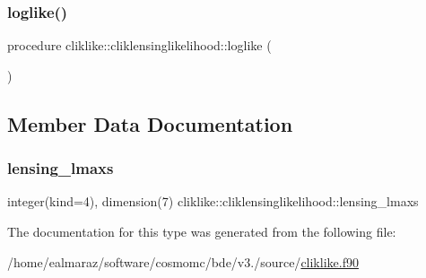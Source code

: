 \subsubsection{\texorpdfstring{loglike()}{loglike()}}
{\footnotesize\ttfamily procedure cliklike\+::cliklensinglikelihood\+::loglike (\begin{DoxyParamCaption}{ }\end{DoxyParamCaption})}



\subsection{Member Data Documentation}
\mbox{\label{structcliklike_1_1cliklensinglikelihood_a9a82c64f795e769f631396177fd0e6d2}} 
\subsubsection{\texorpdfstring{lensing\+\_\+lmaxs}{lensing\_lmaxs}}
{\footnotesize\ttfamily integer(kind=4), dimension(7) cliklike\+::cliklensinglikelihood\+::lensing\+\_\+lmaxs}



The documentation for this type was generated from the following file\+:\begin{DoxyCompactItemize}
\item 
/home/ealmaraz/software/cosmomc/bde/v3./source/\mbox{\hyperlink{cliklike_8f90}{cliklike.\+f90}}\end{DoxyCompactItemize}
